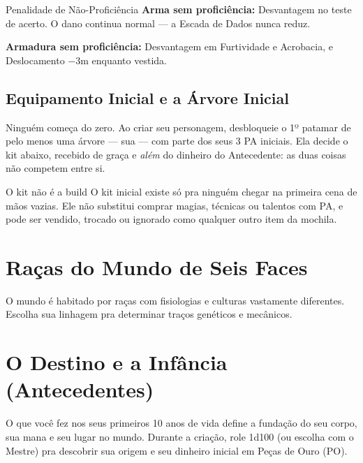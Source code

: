 \begin{aviso}{Penalidade de Não-Proficiência}
    \textbf{Arma sem proficiência:} Desvantagem no teste de acerto. O dano continua normal
    --- a Escada de Dados nunca reduz.

    \medskip
    \textbf{Armadura sem proficiência:} Desvantagem em Furtividade e Acrobacia, e
    Deslocamento $-3$m enquanto vestida.
\end{aviso}

\subsection{Equipamento Inicial e a Árvore Inicial}

Ninguém começa do zero. Ao criar seu personagem, desbloqueie o 1º patamar de pelo menos
uma árvore --- sua  --- com parte dos seus 3 PA iniciais. Ela decide
o kit abaixo, recebido de graça e \emph{além} do dinheiro do Antecedente: as duas coisas
não competem entre si.



\begin{nota}{O kit não é a build}
    O kit inicial existe só pra ninguém chegar na primeira cena de mãos vazias. Ele não
    substitui comprar magias, técnicas ou talentos com PA, e pode ser vendido, trocado ou
    ignorado como qualquer outro item da mochila.
\end{nota}

\section{Raças do Mundo de Seis Faces}

O mundo é habitado por raças com fisiologias e culturas vastamente diferentes. Escolha sua
linhagem pra determinar traços genéticos e mecânicos.



\section{O Destino e a Infância (Antecedentes)}

O que você fez nos seus primeiros 10 anos de vida define a fundação do seu corpo, sua mana
e seu lugar no mundo. Durante a criação, role 1d100 (ou escolha com o Mestre) pra descobrir
sua origem e seu dinheiro inicial em Peças de Ouro (PO).

